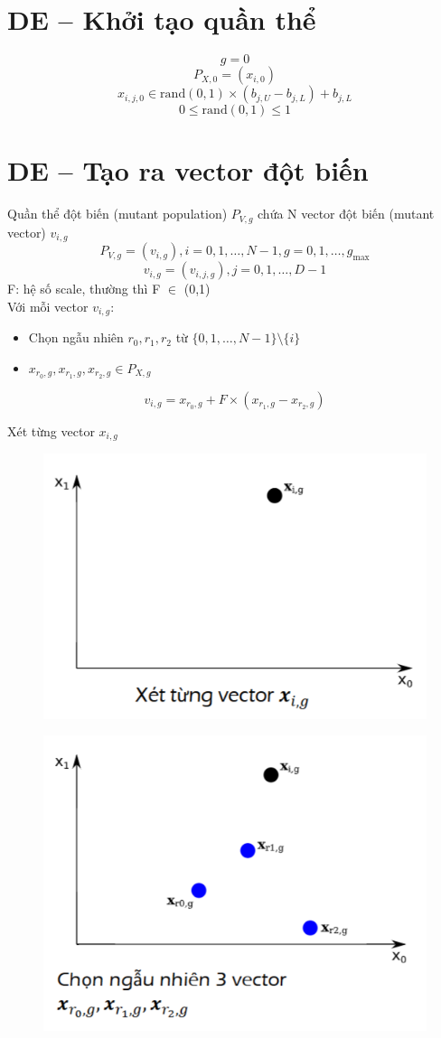 \documentclass{book}
\begin{document}
\section{DE – Khởi tạo quần thể}

$$ g = 0 $$
$$ P_{X,0} = (x_{i,0}) $$
$$ x_{i,j,0} \in \text{rand}(0,1) \times (b_{j,U} - b_{j,L}) + b_{j,L} $$
$$ 0 \le \text{rand}(0,1) \le 1 $$

\section{DE – Tạo ra vector đột biến}

Quần thể đột biến (mutant population) $P_{V,g}$ chứa N vector đột biến (mutant vector) $v_{i,g}$
$$ P_{V,g} = (v_{i,g}), i = 0,1, \dots, N-1, g = 0,1, \dots, g_{\max} $$
$$ v_{i,g} = (v_{i,j,g}), j = 0,1, \dots, D-1 $$
F: hệ số scale, thường thì F $\in$ (0,1) \\
Với mỗi vector $v_{i,g}$:
\begin{itemize}
    \item Chọn ngẫu nhiên $r_0, r_1, r_2$ từ $\{0,1, \dots, N-1\} \setminus \{i\}$
    \item $x_{r_0,g}, x_{r_1,g}, x_{r_2,g} \in P_{X,g}$
\end{itemize}

$$ v_{i,g} = x_{r_0,g} + F \times (x_{r_1,g} - x_{r_2,g}) $$

Xét từng vector $x_{i,g}$

\begin{figure}[H]
    \centering
    \includegraphics[width=0.75\linewidth]{images/GA-3_2.png}
\end{figure}

\begin{figure}[H]
    \centering
    \includegraphics[width=0.75\linewidth]{images/GA-3_3.png}
\end{figure}
\end{document}
